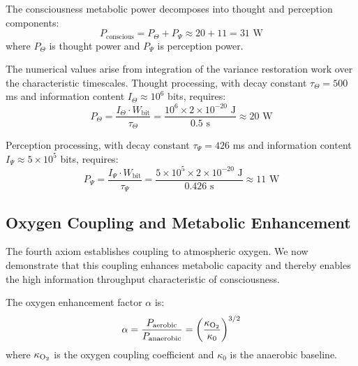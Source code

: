 \begin{theorem}
\label{thm:metabolic_decomp}
The consciousness metabolic power decomposes into thought and perception components:
\begin{equation}
P_{\text{conscious}} = P_{\Theta} + P_{\Psi} \approx 20 + 11 = 31 \text{ W}
\label{eq:metabolic_decomp}
\end{equation}
where $P_{\Theta}$ is thought power and $P_{\Psi}$ is perception power.
\end{theorem}

The numerical values arise from integration of the variance restoration work over the characteristic timescales. Thought processing, with decay constant $\tau_{\Theta} = 500$ ms and information content $I_{\Theta} \approx 10^6$ bits, requires:
\begin{equation}
P_{\Theta} = \frac{I_{\Theta} \cdot W_{\text{bit}}}{\tau_{\Theta}} = \frac{10^6 \times 2 \times 10^{-20} \text{ J}}{0.5 \text{ s}} \approx 20 \text{ W}
\end{equation}

Perception processing, with decay constant $\tau_{\Psi} = 426$ ms and information content $I_{\Psi} \approx 5 \times 10^5$ bits, requires:
\begin{equation}
P_{\Psi} = \frac{I_{\Psi} \cdot W_{\text{bit}}}{\tau_{\Psi}} = \frac{5 \times 10^5 \times 2 \times 10^{-20} \text{ J}}{0.426 \text{ s}} \approx 11 \text{ W}
\end{equation}

\subsection{Oxygen Coupling and Metabolic Enhancement}

The fourth axiom establishes coupling to atmospheric oxygen. We now demonstrate that this coupling enhances metabolic capacity and thereby enables the high information throughput characteristic of consciousness.

\begin{definition}
\label{def:oxygen_enhancement}
The oxygen enhancement factor $\alpha$ is:
\begin{equation}
\alpha = \frac{P_{\text{aerobic}}}{P_{\text{anaerobic}}} = \left(\frac{\kappa_{\ce{O2}}}{\kappa_0}\right)^{3/2}
\label{eq:oxygen_enhancement}
\end{equation}
where $\kappa_{\ce{O2}}$ is the oxygen coupling coefficient and $\kappa_0$ is the anaerobic baseline.
\end{definition}

